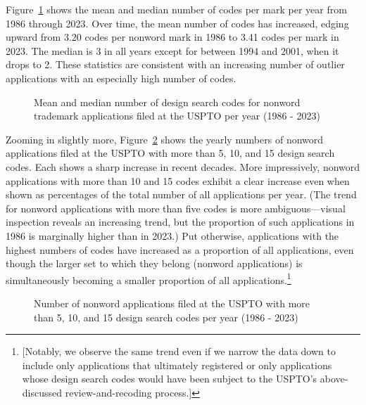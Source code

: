 \documentclass[letterpaper, 11pt, oneside]{article}
\begin{document}
%

Figure~\ref{fig:4} shows the mean and median number of codes per mark per year from 1986 through 2023. Over time, the mean number of codes has increased, edging upward from 3.20 codes per nonword mark in 1986 to 3.41 codes per mark in 2023. The median is 3 in all years except for between 1994 and 2001, when it drops to 2. These statistics are consistent with an increasing number of outlier applications with an especially high number of codes.

\begin{figure}[H]
\centering

\caption{\label{fig:4} Mean and median number of design search codes for nonword trademark applications filed at the USPTO per year (1986 - 2023)}
\end{figure}

Zooming in slightly more, Figure~\ref{fig:5} shows the yearly numbers of nonword applications filed at the USPTO with more than 5, 10, and 15 design search codes. Each shows a sharp increase in recent decades. More impressively, nonword applications with more than 10 and 15 codes exhibit a clear increase even when shown as percentages of the total number of all applications per year. (The trend for nonword applications with more than five codes is more ambiguous—visual inspection reveals an increasing trend, but the proportion of such applications in 1986 is marginally higher than in 2023.) Put otherwise, applications with the highest numbers of codes have increased as a proportion of all applications, even though the larger set to which they belong (nonword applications) is simultaneously becoming a smaller proportion of all applications.\footnote{[Notably, we observe the same trend even if we narrow the data down to include only applications that ultimately registered or only applications whose design search codes would have been subject to the USPTO's above-discussed review-and-recoding process.]}

\begin{figure}[H]
\centering

\caption{\label{fig:5} Number of nonword applications filed at the USPTO with more than 5, 10, and 15 design search codes per year (1986 - 2023)}
\end{figure}
\end{document}
